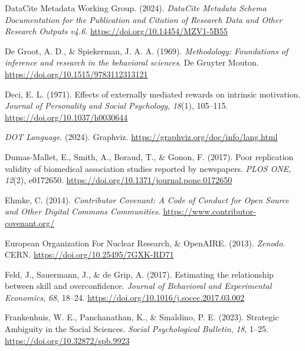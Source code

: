 \documentclass[
  man, noextraspace,floatsintext]{apa7}
\newlength{\cslhangindent}
\newenvironment{CSLReferences}[2] %
 {\begin{list}{}{%
  \setlength{\itemindent}{0pt}
  \setlength{\leftmargin}{0pt}
  \setlength{\parsep}{0pt}
  \ifodd #1
   \setlength{\leftmargin}{\cslhangindent}
   \setlength{\itemindent}{-1\cslhangindent}
  \fi
  \setlength{\itemsep}{#2\baselineskip}}}
 {\end{list}}
\begin{document}
\begin{CSLReferences}{1}{0}
DataCite Metadata Working Group. (2024). \emph{{DataCite Metadata Schema Documentation} for the {Publication} and {Citation} of {Research Data} and {Other Research Outputs} v4.6}. \url{https://doi.org/10.14454/MZV1-5B55}

De Groot, A. D., \& Spiekerman, J. A. A. (1969). \emph{Methodology: {Foundations} of inference and research in the behavioral sciences}. De Gruyter Mouton. \url{https://doi.org/10.1515/9783112313121}

Deci, E. L. (1971). Effects of externally mediated rewards on intrinsic motivation. \emph{Journal of Personality and Social Psychology}, \emph{18}(1), 105--115. \url{https://doi.org/10.1037/h0030644}

\emph{{DOT Language}}. (2024). Graphviz. \url{https://graphviz.org/doc/info/lang.html}

Dumas-Mallet, E., Smith, A., Boraud, T., \& Gonon, F. (2017). Poor replication validity of biomedical association studies reported by newspapers. \emph{PLOS ONE}, \emph{12}(2), e0172650. \url{https://doi.org/10.1371/journal.pone.0172650}

Ehmke, C. (2014). \emph{Contributor {Covenant}: {A Code} of {Conduct} for {Open Source} and {Other Digital Commons Communities}}. \url{https://www.contributor-covenant.org/}

European Organization For Nuclear Research, \& OpenAIRE. (2013). \emph{Zenodo}. CERN. \url{https://doi.org/10.25495/7GXK-RD71}

Feld, J., Sauermann, J., \& de Grip, A. (2017). Estimating the relationship between skill and overconfidence. \emph{Journal of Behavioral and Experimental Economics}, \emph{68}, 18--24. \url{https://doi.org/10.1016/j.socec.2017.03.002}

Frankenhuis, W. E., Panchanathan, K., \& Smaldino, P. E. (2023). Strategic {Ambiguity} in the {Social Sciences}. \emph{Social Psychological Bulletin}, \emph{18}, 1--25. \url{https://doi.org/10.32872/spb.9923}


\end{CSLReferences}
\end{document}
